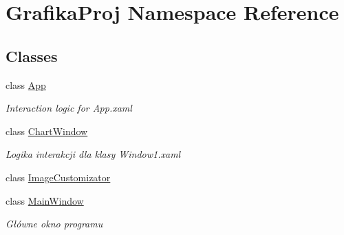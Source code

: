\hypertarget{namespace_grafika_proj}{}\section{Grafika\+Proj Namespace Reference}
\label{namespace_grafika_proj}
\subsection*{Classes}
\begin{DoxyCompactItemize}
\item 
class \mbox{\hyperlink{class_grafika_proj_1_1_app}{App}}
\begin{DoxyCompactList}\small\item\em Interaction logic for App.\+xaml \end{DoxyCompactList}\item 
class \mbox{\hyperlink{class_grafika_proj_1_1_chart_window}{Chart\+Window}}
\begin{DoxyCompactList}\small\item\em Logika interakcji dla klasy Window1.\+xaml \end{DoxyCompactList}\item 
class \mbox{\hyperlink{class_grafika_proj_1_1_image_customizator}{Image\+Customizator}}
\item 
class \mbox{\hyperlink{class_grafika_proj_1_1_main_window}{Main\+Window}}
\begin{DoxyCompactList}\small\item\em Główne okno programu \end{DoxyCompactList}\end{DoxyCompactItemize}
